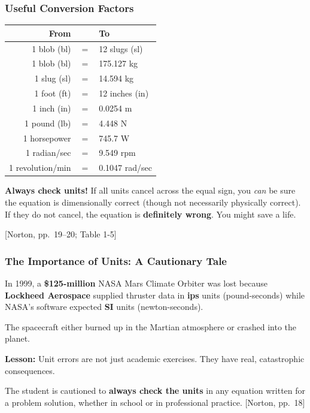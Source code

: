 \documentclass[10pt,aspectratio=43]{beamer}
\newcommand{\pref}[1]{\vfill\hfill{\scriptsize\color{gray}[Norton, pp.~#1]}}
\begin{document}
\begin{frame}
\frametitle{Useful Conversion Factors}

\begin{center}
\small
\begin{tabular}{rcl}
\toprule
\textbf{From} & & \textbf{To} \\
\midrule
1 blob (bl) & $=$ & 12 slugs (sl) \\
1 blob (bl) & $=$ & 175.127 kg \\
1 slug (sl) & $=$ & 14.594 kg \\
1 foot (ft) & $=$ & 12 inches (in) \\
1 inch (in) & $=$ & 0.0254 m \\
1 pound (lb) & $=$ & 4.448 N \\
1 horsepower & $=$ & 745.7 W \\
1 radian/sec & $=$ & 9.549 rpm \\
1 revolution/min & $=$ & 0.1047 rad/sec \\
\bottomrule
\end{tabular}
\end{center}

\vspace{6pt}
\begin{redbox}
\textbf{Always check units!} If all units cancel across the equal sign, you \emph{can} be sure the equation is dimensionally correct (though not necessarily physically correct). If they do not cancel, the equation is \textbf{definitely wrong}. You might save a life.
\end{redbox}
\pref{19--20; Table 1-5}
\end{frame}


\begin{frame}
\frametitle{The Importance of Units: A Cautionary Tale}

\begin{redbox}
In 1999, a \textbf{\$125-million} NASA Mars Climate Orbiter was lost because \textbf{Lockheed Aerospace} supplied thruster data in \textbf{ips} units (pound-seconds) while NASA's software expected \textbf{SI} units (newton-seconds).

The spacecraft either burned up in the Martian atmosphere or crashed into the planet.
\end{redbox}

\vspace{6pt}
\textbf{Lesson:} Unit errors are not just academic exercises. They have real, catastrophic consequences.

\vspace{6pt}
The student is cautioned to \textbf{always check the units} in any equation written for a problem solution, whether in school or in professional practice.
\pref{18}
\end{frame}
\end{document}
